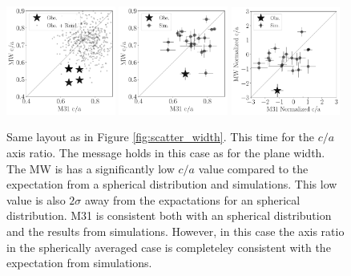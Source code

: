 \documentclass[a4paper,fleqn,usenatbib]{mnras}
\begin{document}
\begin{figure}
\centering
\includegraphics[width=0.32\textwidth]{scatter_random_ranked_ca_ratio.pdf}
\includegraphics[width=0.32\textwidth]{scatter_ranked_ca_ratio.pdf}
\includegraphics[width=0.32\textwidth]{scatter_norm_ranked_ca_ratio.pdf}
\caption{Same layout as in Figure \ref{fig:scatter_width}. 
This time for the $c/a$ axis ratio. 
The message holds in this case as for the plane width.
The MW is has a significantly low $c/a$ value compared to the
expectation from a spherical distribution and simulations. 
This low value is also $2\sigma$ away from the expactations for an
spherical distribution.
M31 is consistent both with an spherical distribution and the results
from simulations.
However, in this case the axis ratio in the spherically averaged case
is completeley consistent with the expectation from simulations.
\label{fig:scatter_ca_ratio}}
\end{figure}
\end{document}
